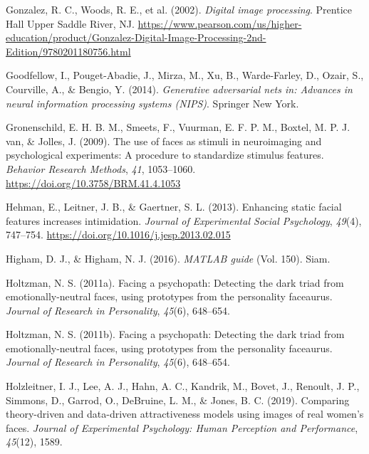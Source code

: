 \documentclass[
  doc,floatsintext]{apa6}
\newlength{\cslhangindent}
\newlength{\cslentryspacingunit} %
\newenvironment{CSLReferences}[2] %
 {%
  \setlength{\parindent}{0pt}
  \ifodd #1
  \let\oldpar\par
  \def\par{\hangindent=\cslhangindent\oldpar}
  \fi
  \setlength{\parskip}{#2\cslentryspacingunit}
 }%
 {}
\begin{document}
\begin{CSLReferences}{1}{0}
\leavevmode{}%
Gonzalez, R. C., Woods, R. E., et al. (2002). \emph{Digital image processing}. Prentice Hall Upper Saddle River, NJ. \url{https://www.pearson.com/us/higher-education/product/Gonzalez-Digital-Image-Processing-2nd-Edition/9780201180756.html}

\leavevmode{}%
Goodfellow, I., Pouget-Abadie, J., Mirza, M., Xu, B., Warde-Farley, D., Ozair, S., Courville, A., \& Bengio, Y. (2014). \emph{Generative adversarial nets in: Advances in neural information processing systems (NIPS)}. Springer New York.

\leavevmode{}%
Gronenschild, E. H. B. M., Smeets, F., Vuurman, E. F. P. M., Boxtel, M. P. J. van, \& Jolles, J. (2009). The use of faces as stimuli in neuroimaging and psychological experiments: A procedure to standardize stimulus features. \emph{Behavior Research Methods}, \emph{41}, 1053--1060. \url{https://doi.org/10.3758/BRM.41.4.1053}

\leavevmode{}%
Hehman, E., Leitner, J. B., \& Gaertner, S. L. (2013). Enhancing static facial features increases intimidation. \emph{Journal of Experimental Social Psychology}, \emph{49}(4), 747--754. \url{https://doi.org/10.1016/j.jesp.2013.02.015}

\leavevmode{}%
Higham, D. J., \& Higham, N. J. (2016). \emph{MATLAB guide} (Vol. 150). Siam.

\leavevmode{}%
Holtzman, N. S. (2011a). Facing a psychopath: Detecting the dark triad from emotionally-neutral faces, using prototypes from the personality faceaurus. \emph{Journal of Research in Personality}, \emph{45}(6), 648--654.

\leavevmode{}%
Holtzman, N. S. (2011b). Facing a psychopath: Detecting the dark triad from emotionally-neutral faces, using prototypes from the personality faceaurus. \emph{Journal of Research in Personality}, \emph{45}(6), 648--654.

\leavevmode{}%
Holzleitner, I. J., Lee, A. J., Hahn, A. C., Kandrik, M., Bovet, J., Renoult, J. P., Simmons, D., Garrod, O., DeBruine, L. M., \& Jones, B. C. (2019). Comparing theory-driven and data-driven attractiveness models using images of real women's faces. \emph{Journal of Experimental Psychology: Human Perception and Performance}, \emph{45}(12), 1589.


\end{CSLReferences}
\end{document}
